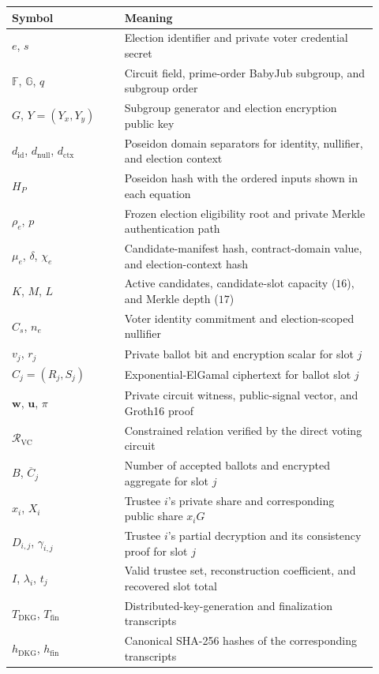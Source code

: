 \begin{center}
\begin{minipage}{\linewidth}
\centering
\makeatletter{}\makeatother
\caption{Consolidated notation for the private-voting and tally protocol.}
\label{tab:protocol-notation}
\footnotesize
\begin{tabular}{@{}p{0.29\linewidth}p{0.63\linewidth}@{}}
\toprule
\textbf{Symbol} & \textbf{Meaning} \\
\midrule
$e$, $s$ & Election identifier and private voter credential secret \\
$\mathbb{F}$, $\mathbb{G}$, $q$ & Circuit field, prime-order BabyJub subgroup, and subgroup order \\
$G$, $Y=(Y_x,Y_y)$ & Subgroup generator and election encryption public key \\
$d_{\mathrm{id}}$, $d_{\mathrm{null}}$, $d_{\mathrm{ctx}}$ & Poseidon domain separators for identity, nullifier, and election context \\
$H_P$ & Poseidon hash with the ordered inputs shown in each equation \\
$\rho_e$, $p$ & Frozen election eligibility root and private Merkle authentication path \\
$\mu_e$, $\delta$, $\chi_e$ & Candidate-manifest hash, contract-domain value, and election-context hash \\
$K$, $M$, $L$ & Active candidates, candidate-slot capacity ($16$), and Merkle depth ($17$) \\
$C_s$, $n_e$ & Voter identity commitment and election-scoped nullifier \\
$v_j$, $r_j$ & Private ballot bit and encryption scalar for slot $j$ \\
$C_j=(R_j,S_j)$ & Exponential-ElGamal ciphertext for ballot slot $j$ \\
$\mathbf{w}$, $\mathbf{u}$, $\pi$ & Private circuit witness, public-signal vector, and Groth16 proof \\
$\mathcal{R}_{\mathrm{VC}}$ & Constrained relation verified by the direct voting circuit \\
$B$, $\overline{C}_j$ & Number of accepted ballots and encrypted aggregate for slot $j$ \\
$x_i$, $X_i$ & Trustee $i$'s private share and corresponding public share $x_iG$ \\
$D_{i,j}$, $\gamma_{i,j}$ & Trustee $i$'s partial decryption and its consistency proof for slot $j$ \\
$I$, $\lambda_i$, $t_j$ & Valid trustee set, reconstruction coefficient, and recovered slot total \\
$T_{\mathrm{DKG}}$, $T_{\mathrm{fin}}$ & Distributed-key-generation and finalization transcripts \\
$h_{\mathrm{DKG}}$, $h_{\mathrm{fin}}$ & Canonical SHA-256 hashes of the corresponding transcripts \\
\bottomrule
\end{tabular}
\end{minipage}
\end{center}

